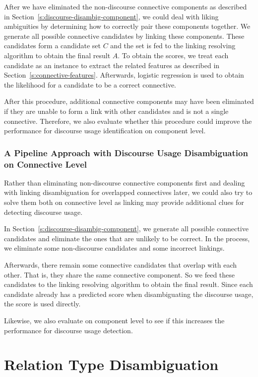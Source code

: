 After we have eliminated the non-discourse connective components as described
in Section~\ref{s:discourse-disambig-component}, we could
deal with liking ambiguities by determining how to correctly pair these
components together. We generate all possible connective candidates by
linking these components. These candidates form a candidate set $ C $ and the set is
fed to the linking resolving algorithm to obtain the final result $ A $.
To obtain the scores, we treat each candidate as an instance to
extract the related features as described in Section~\ref{s:connective-features}.
Afterwards, logistic regression is used to obtain the likelihood for a
candidate to be a correct connective.

After this procedure, additional connective components may have been eliminated if
they are unable to form a link with other candidates and is not a single connective.
Therefore, we also evaluate whether this procedure could improve the performance
for discourse usage identification on component level.


\subsubsection{A Pipeline Approach with Discourse Usage Disambiguation on Connective Level}
\label{s:pipeline2}

Rather than eliminating non-discourse connective components first and
dealing with linking disambiguation for overlapped connectives later,
we could also try to solve them both on connective level as linking may
provide additional clues for detecting discourse usage. 

In Section~\ref{s:discourse-disambig-component}, we generate all possible
connective candidates and eliminate the ones that are unlikely to be correct.
In the process, we eliminate some non-discourse candidates and some incorrect
linkings.

Afterwards, there remain some connective candidates that overlap with each other.
That is, they share the same connective component. So we feed these candidates
to the linking resolving algorithm to obtain the final result. Since each candidate
already has a predicted score when disambiguating the discourse usage, the score
is used directly.

Likewise, we also evaluate on component level to see if this increases
the performance for discourse usage detection.

\section{Relation Type Disambiguation}

